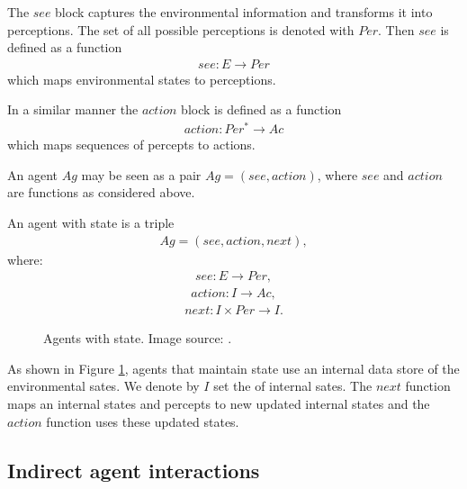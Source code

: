 The $see$ block captures the environmental information and transforms it into perceptions. The set of all possible perceptions is denoted with $Per$.  Then $see$ is defined as a function
\begin{align}
see: E \rightarrow  Per
\end{align}
which maps environmental states to perceptions.

In a similar manner the $action$ block is defined as a function 
\begin{align}
action:Per^{*} \rightarrow  Ac
\end{align}
which maps sequences of percepts to actions. 

\begin{remark}
An agent $Ag$ may be seen as a pair $Ag = (see, action)$, where $see$  and  $action$ are functions as considered above.
\end{remark}

\begin{definition}
An agent with state is a triple
\begin{align}
Ag = (see, action, next),
\end{align}
where:
\begin{align}
see: E \rightarrow  Per,
\end{align}
\begin{align}
action : I \rightarrow Ac,
\end{align}
\begin{align}
next: I \times Per \rightarrow I.
\end{align}
\end{definition}

\begin{figure}[h!]
\centerline{}
      \caption[Agents with state.]{Agents with state. Image source: \cite{Wooldridge09AnIntroduction}.}
\label{fig:agentstate1}
\end{figure}


As shown in Figure \ref{fig:agentstate1}, agents that maintain state use an internal data store of the environmental sates. We denote by $I$ set the of internal sates. The $next$ function maps an internal states and percepts to new updated internal states and the $action$ function uses these updated states.


\subsection{Indirect agent interactions}

